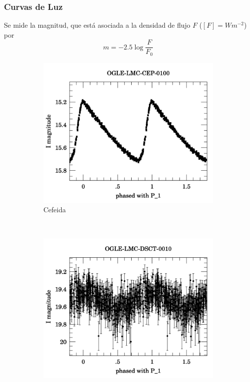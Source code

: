 \documentclass{beamer}
\begin{document}
\begin{frame}
  \frametitle{Curvas de Luz}
  Se mide la magnitud, que está asociada a la densidad de flujo $F$ ($[F] = Wm^{-2}$) por 
  \begin{equation}
    m = -2.5\log \frac{F}{F_0}
  \end{equation} 
  \begin{figure}
    \centering
    \begin{subfigure}[b]{0.4\textwidth}
      \includegraphics[width=\textwidth]{./img/OGLE-LMC-CEP-0100_1.png}
      \caption{Cefeida}
      \label{fig:gull}
    \end{subfigure}%
    ~ %
    \begin{subfigure}[b]{0.4\textwidth}
      \includegraphics[width=\textwidth]{./img/OGLE-LMC-DSCT-0010_1.png}

\end{subfigure}
\end{figure}
\end{frame}
\end{document}

